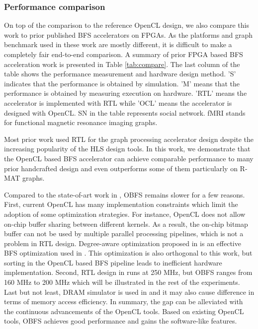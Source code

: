 \subsubsection{Performance comparison}
On top of the comparison to the reference OpenCL design, we also compare 
this work to prior published BFS accelerators on FPGAs. As the platforms 
and graph benchmark used in these work are mostly different, it is 
difficult to make a completely fair end-to-end comparison. 
A summary of prior FPGA based BFS acceleration work is presented in Table \ref{tab:compare}. 
The last column of the table shows the performance measurement and hardware design method. 
'S' indicates that the performance is obtained by simulation. 
'M' means that the performance is obtained by measuring execution on hardware. 
'RTL' means the accelerator is implemented with RTL while 'OCL' means the 
accelerator is designed with OpenCL. SN in the table represents social network. 
fMRI stands for functional magnetic resonance imaging graphs. 

Most prior work used RTL for the graph processing accelerator design
despite the increasing popularity of the HLS design tools.
In this work, we demonstrate that the OpenCL based BFS accelerator can achieve
comparable performance to many prior handcrafted design and even 
outperforms some of them particularly on R-MAT graphs. 

Compared to the state-of-art work in \cite{yao2018efficient}, 
OBFS remains slower for a few reasons. First, current OpenCL has many implementation 
constraints which limit the adoption of some optimization strategies. For instance, 
OpenCL does not allow on-chip buffer sharing between different kernels. 
As a result, the on-chip bitmap buffer can not be used by multiple parallel
processing pipelines, which is not a problem in RTL design. Degree-aware optimization 
proposed in \cite{zhang2018degree} is an effective BFS optimization 
used in \cite{yao2018efficient}. This optimization is also orthogonal to this work, 
but sorting in the OpenCL based BFS pipeline leads to inefficient hardware implementation.
Second, RTL design in \cite{yao2018efficient} runs at 250 MHz, but OBFS 
ranges from 160 MHz to 200 MHz which will be illustrated in the rest of 
the experiments. Last but not least, DRAM simulator is 
used in \cite{yao2018efficient} and it may also cause difference 
in terms of memory access efficiency. In summary, the gap can be 
alleviated with the continuous advancements of the OpenCL tools. 
Based on existing OpenCL tools, OBFS achieves good performance and 
gains the software-like features.

